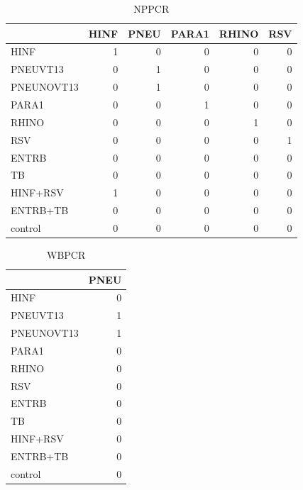 \documentclass[article]{jss}
\begin{document}
\begin{CodeChunk}
\begin{table}

\caption{NPPCR}
\begin{tabular}{l|r|r|r|r|r}
\hline
  & HINF & PNEU & PARA1 & RHINO & RSV\\
\hline
HINF & 1 & 0 & 0 & 0 & 0\\
\hline
PNEUVT13 & 0 & 1 & 0 & 0 & 0\\
\hline
PNEUNOVT13 & 0 & 1 & 0 & 0 & 0\\
\hline
PARA1 & 0 & 0 & 1 & 0 & 0\\
\hline
RHINO & 0 & 0 & 0 & 1 & 0\\
\hline
RSV & 0 & 0 & 0 & 0 & 1\\
\hline
ENTRB & 0 & 0 & 0 & 0 & 0\\
\hline
TB & 0 & 0 & 0 & 0 & 0\\
\hline
HINF+RSV & 1 & 0 & 0 & 0 & 0\\
\hline
ENTRB+TB & 0 & 0 & 0 & 0 & 0\\
\hline
control & 0 & 0 & 0 & 0 & 0\\
\hline
\end{tabular}
\end{table}

\begin{table}

\caption{WBPCR}
\begin{tabular}{l|r}
\hline
  & PNEU\\
\hline
HINF & 0\\
\hline
PNEUVT13 & 1\\
\hline
PNEUNOVT13 & 1\\
\hline
PARA1 & 0\\
\hline
RHINO & 0\\
\hline
RSV & 0\\
\hline
ENTRB & 0\\
\hline
TB & 0\\
\hline
HINF+RSV & 0\\
\hline
ENTRB+TB & 0\\
\hline
control & 0\\
\hline
\end{tabular}
\end{table}

\begin{table}


\end{table}
\end{CodeChunk}
\end{document}
